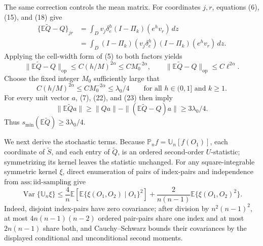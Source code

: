 The same correction controls the mean matrix.  For coordinates \(j,r\), equations (6), (15), and (18) give
\[
 \begin{split}
 \{\mathbb E\widetilde Q-Q\}_{jr}
 &=\int_Dv_j\delta_e^h(I-\Pi_k)(e^hv_r)\,dz\\
 &=\int_D(I-\Pi_k)(v_j\delta_e^h)(I-\Pi_k)(e^hv_r)\,dz.
 \end{split}
 \tag{21}
\]
Applying the cell-width form of (5) to both factors yields
\[
 \|\mathbb E\widetilde Q-Q\|_{\mathrm{op}}
 \leq C(h/M)^{2\alpha}\leq CM_0^{-2\alpha},
 \qquad
 \|\mathbb E\widetilde Q-Q\|_{\mathrm{op}}\leq C\ell^{2\alpha}.
 \tag{22}
\]
Choose the fixed integer \(M_0\) sufficiently large that
\[
 C(h/M)^{2\alpha}\leq CM_0^{-2\alpha}\leq\lambda_0/4
 \qquad\text{for all }h\in(0,1]\text{ and }k\geq1.
 \tag{23}
\]
For every unit vector \(a\), (7), (22), and (23) then imply
\[
 \|\mathbb E\widetilde Qa\|
 \geq\|Qa\|-\|(\mathbb E\widetilde Q-Q)a\|
 \geq3\lambda_0/4.
 \tag{24}
\]
Thus \(s_{\min}(\mathbb E\widetilde Q)\geq3\lambda_0/4\).

We next derive the stochastic terms.  Because \(\mathbb P_nf=\mathbb U_n[f(O_1)]\), each coordinate of \(\widetilde S\), and each entry of \(\widetilde Q\), is an ordered second-order \(U\)-statistic; symmetrizing its kernel leaves the statistic unchanged.  For any square-integrable symmetric kernel \(\xi\), direct enumeration of pairs of index-pairs and independence from \(\mathrm{ass:iid\mbox{-}sampling}\) give
\[
 \operatorname{Var}\{\mathbb U_n\xi\}
 \leq\frac4n\mathbb E\left[\mathbb E\{\xi(O_1,O_2)\mid O_1\}^2\right]
 +\frac{2}{n(n-1)}\mathbb E\{\xi(O_1,O_2)^2\}.
 \tag{25}
\]
Indeed, disjoint index-pairs have zero covariance; after division by \(n^2(n-1)^2\), at most \(4n(n-1)(n-2)\) ordered pair-pairs share one index and at most \(2n(n-1)\) share both, and Cauchy--Schwarz bounds their covariances by the displayed conditional and unconditional second moments.

